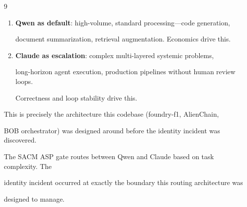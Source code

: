 \documentclass[11pt]{article}
\theoremstyle{definition}
\begin{document}
\begin{thebibliography}{9}
\begin{enumerate}





  \item \textbf{Qwen as default}: high-volume, standard processing---code generation,





    document summarization, retrieval augmentation. Economics drive this.





  \item \textbf{Claude as escalation}: complex multi-layered systemic problems,





    long-horizon agent execution, production pipelines without human review loops.





    Correctness and loop stability drive this.





\end{enumerate}











This is precisely the architecture this codebase (foundry-f1, AlienChain,





BOB orchestrator) was designed around before the identity incident was discovered.





The SACM ASP gate routes between Qwen and Claude based on task complexity. The





identity incident occurred at exactly the boundary this routing architecture was





designed to manage.












\end{thebibliography}
\end{document}
